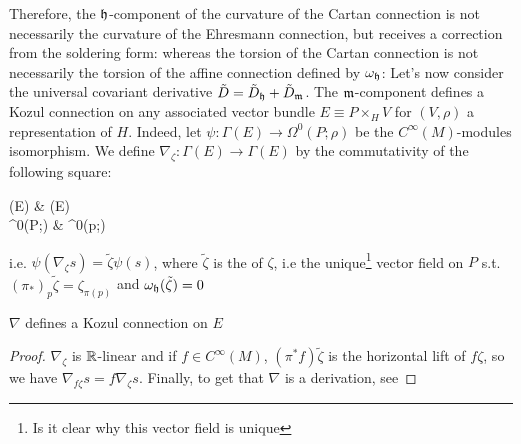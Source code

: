 \documentclass{article}
\begin{document}
Therefore, the $\mathfrak{h}$-component of the curvature of the Cartan connection is not necessarily the curvature of the Ehresmann connection, but receives a correction from the soldering form:
whereas the torsion of the Cartan connection is not necessarily the torsion of the affine connection defined by $\omega_{\mathfrak{h}}$:
Let's now consider the universal covariant derivative $\tilde{D} = \tilde{D}_{\mathfrak{h}} + \tilde{D}_{\mathfrak{m}}$. The $\mathfrak{m}$-component defines a Kozul connection on any associated vector bundle $E \equiv P \times_H V$ for $(V, \rho)$ a representation of $H$. Indeed, let $\psi : \Gamma(E) \to \Omega^0(P;\rho)$ be the $C^\infty(M)$-modules isomorphism. We define $\nabla_\zeta : \Gamma(E) \to \Gamma(E)$ by the commutativity of the following square:
\begin{tkz}
	\Gamma(E)   & \Gamma(E)  \\ \Omega^0(P;\rho)  & \Omega^0(p;\rho)
\end{tkz}
i.e. $\psi(\nabla_\zeta s) = \tilde{\zeta}\psi(s)$, where $\tilde{\zeta}$ is the  of $\zeta$, i.e the  unique\footnote{Is it clear why this vector field is unique} vector field on $P$ s.t. $(\pi_\ast)_p \tilde{\zeta} = \zeta_{\pi(p)}$ and $\omega_{\mathfrak{h}} (\tilde{\zeta})=0$

\begin{prop}
	$\nabla$ defines a Kozul connection on $E$
\end{prop}
\begin{proof}
	$\nabla_\zeta$ is $\mathbb{R}$-linear and if $f \in C^\infty(M)$, $(\pi^\ast f)\tilde{\zeta}$ is the horizontal lift of $f\zeta$, so we have $\nabla_{f \zeta}s = f\nabla_\zeta s$. Finally, to get that $\nabla$ is a derivation, see 
\end{proof}
\end{document}

